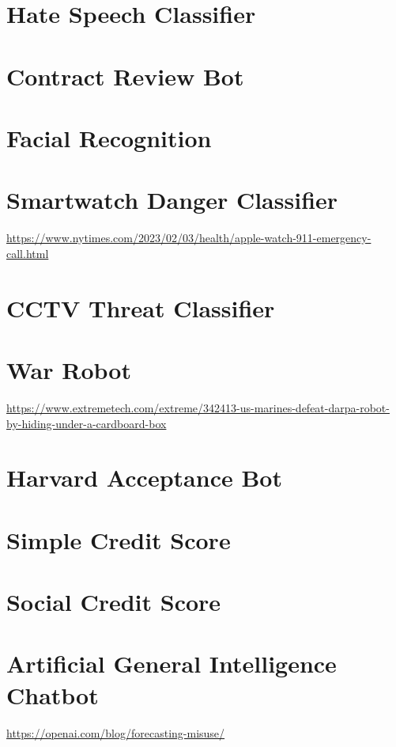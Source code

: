 \section{Hate Speech Classifier}
\section{Contract Review Bot}
\section{Facial Recognition}
\section{Smartwatch Danger Classifier} 

\url{https://www.nytimes.com/2023/02/03/health/apple-watch-911-emergency-call.html}

\section{CCTV Threat Classifier}
\section{War Robot}

\url{https://www.extremetech.com/extreme/342413-us-marines-defeat-darpa-robot-by-hiding-under-a-cardboard-box}

\section{Harvard Acceptance Bot}
\section{Simple Credit Score}
\section{Social Credit Score}
\section{Artificial General Intelligence Chatbot}

\url{https://openai.com/blog/forecasting-misuse/}
